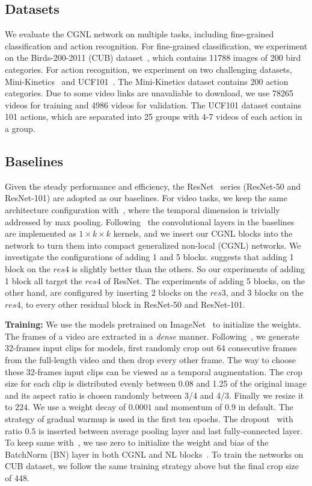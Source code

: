 \documentclass{article}
\begin{document}
\subsection{Datasets}
We evaluate the CGNL network on multiple tasks, including fine-grained classification and action recognition.
For fine-grained classification, we experiment on the Birds-200-2011 (CUB) dataset~\cite{welinder2010caltech}, which contains 11788 images of 200 bird categories.
For action recognition, we experiment on two challenging datasets, Mini-Kinetics~\cite{mini-kinetics} and UCF101~\cite{ucf101}.
The Mini-Kinetics dataset contains 200 action categories.
Due to some video links are unavaliable to download, we use 78265 videos for training and 4986 videos for validation.
The UCF101 dataset contains 101 actions, which are separated into 25 groups with 4-7 videos of each action in a group.
%
%
\subsection{Baselines}
Given the steady performance and efficiency, the ResNet~\cite{resnet} series (ResNet-50 and ResNet-101) are adopted as our baselines.
For video tasks, we keep the same architecture configuration with~\cite{non-local}, where the temporal dimension is trivially addressed by max pooling.
Following~\cite{non-local} the convolutional layers in the baselines are implemented as $1 \times k \times k$ kernels, and we insert our CGNL blocks into the network to turn them into compact generalized non-local (CGNL) networks.
We investigate the configurations of adding 1 and 5 blocks.
\cite{non-local} suggests that adding 1 block on the $res4$ is slightly better than the others.
So our experiments of adding 1 block all target the $res4$ of ResNet.
The experiments of adding 5 blocks, on the other hand, are configured by inserting 2 blocks on the $res3$, and 3 blocks on the $res4$, to every other residual block in ResNet-50 and ResNet-101.

\textbf{Training:}
We use the models pretrained on ImageNet~\cite{imagenet} to initialize the weights.
The frames of a video are extracted in a \emph{dense} manner.
Following~\cite{non-local}, we generate 32-frames input clips for models, first randomly crop out 64 consecutive frames from the full-length video and then drop every other frame.
The way to choose these 32-frames input clips can be viewed as a temporal augmentation.
The crop size for each clip is distributed evenly between 0.08 and 1.25 of the original image and its aspect ratio is chosen randomly between 3/4 and 4/3. Finally we resize it to $224$.
We use a weight decay of $0.0001$ and momentum of $0.9$ in default. 
The strategy of gradual warmup is used in the first ten epochs.
The dropout~\cite{dropout} with ratio $0.5$ is inserted between average pooling layer and last fully-connected layer.
To keep same with~\cite{non-local}, we use zero to initialize the weight and bias of the BatchNorm (BN) layer in both CGNL and NL blocks~\cite{train_imagenet_in_1h}.
To train the networks on CUB dataset, we follow the same training strategy above but the final crop size of 448. 
\end{document}
